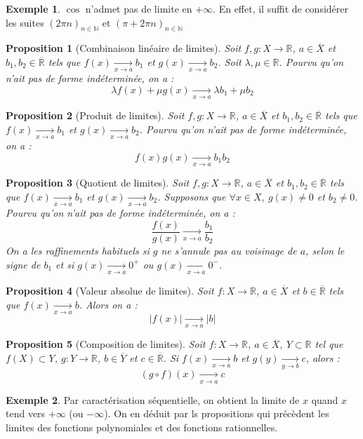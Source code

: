 \documentclass[french]{book}
\newcommand{\N}{\mathbb{N}}
\newcommand{\R}{\mathbb{R}}
\theoremstyle{plain}
\newtheorem{prop}{Proposition}[chapter]
\theoremstyle{definition}
\newtheorem{exa}{Exemple}[chapter]
\theoremstyle{remark}
\begin{document}
\begin{exa}
	$\cos$ n'admet pas de limite en $+\infty$. En effet, il suffit de considérer les suites $(2\pi n)_{n\in\N}$ et $(\pi+2\pi n)_{n\in\N}$
\end{exa}
\begin{prop}[Combinaison linéaire de limites]
	Soit $f,g:X\rightarrow\R$, $a\in\overline{X}$ et $b_1,b_2\in\overline{\R}$ tels que $f(x)\xrightarrow[x\to a]{}b_1$ et $g(x)\xrightarrow[x\to a]{}b_2$. Soit $\lambda,\mu\in\R$. Pourvu qu'on n'ait pas de forme indéterminée, on a : $$\lambda f(x)+\mu g(x)\xrightarrow[x\to a]{}\lambda b_1+\mu b_2$$
\end{prop}
\begin{prop}[Produit de limites]
	Soit $f,g:X\rightarrow\R$, $a\in\overline{X}$ et $b_1,b_2\in\overline{\R}$ tels que $f(x)\xrightarrow[x\to a]{}b_1$ et $g(x)\xrightarrow[x\to a]{}b_2$. Pourvu qu'on n'ait pas de forme indéterminée, on a : $$f(x)g(x)\xrightarrow[x\to a]{}b_1b_2$$
\end{prop}
\begin{prop}[Quotient de limites]
	Soit $f,g:X\rightarrow\R$, $a\in\overline{X}$ et $b_1,b_2\in\overline{\R}$ tels que $f(x)\xrightarrow[x\to a]{}b_1$ et $g(x)\xrightarrow[x\to a]{}b_2$. Supposons que $\forall x\in X,\ g(x)\ne0$ et $b_2\ne0$. Pourvu qu'on n'ait pas de forme indéterminée, on a : $$\frac{f(x)}{g(x)}\xrightarrow[x\to a]{}\frac{b_1}{b_2}$$ On a les raffinements habituels si $g$ ne s'annule pas au voisinage de $a$, selon le signe de $b_1$ et si $g(x)\xrightarrow[x\to a]{}0^+$ ou $g(x)\xrightarrow[x\to a]{}0^-$.
\end{prop}
\begin{prop}[Valeur absolue de limites]
	Soit $f:X\rightarrow\R$, $a\in\overline{X}$ et $b\in\overline{\R}$ tels que $f(x)\xrightarrow[x\to a]{}b$. Alors on a : $$\lvert f(x)\rvert \xrightarrow[x\to a]{}\lvert b\rvert$$
\end{prop}
\begin{prop}[Composition de limites]
	Soit $f:X\rightarrow\R$, $a\in\overline{X}$, $Y\subset\R$ tel que $f(X)\subset Y$, $g:Y\rightarrow\R$, $b\in \overline{Y}$ et $c\in\overline{\R}$. Si $f(x)\xrightarrow[x\to a]{}b$ et $g(y)\xrightarrow[y\to b]{}c$, alors : $$\left(g\circ f\right)(x)\xrightarrow[x\to a]{}c$$
\end{prop}
\begin{exa}
	Par caractérisation séquentielle, on obtient la limite de $x$ quand $x$ tend vers $+\infty$ (ou $-\infty$). On en déduit par ls propositions qui précèdent les limites des fonctions polynomiales et des fonctions rationnelles.
\end{exa}
\end{document}
